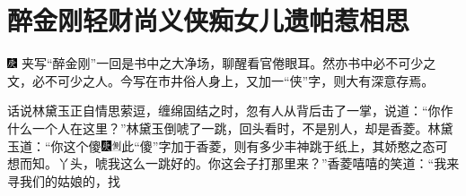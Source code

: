 

\chapter{醉金刚轻财尚义侠\hspace{.5em}痴女儿遗帕惹相思}
{}

{\includegraphics[width=3mm]{../Images/00004}  \kaishu 夹写``醉金刚''一回是书中之大净场，聊醒看官倦眼耳。然亦书中必不可少之文，必不可少之人。今写在市井俗人身上，又加一``侠''字，则大有深意存焉。}

话说林黛玉正自情思萦逗，缠绵固结之时，忽有人从背后击了一掌，说道：``你作什么一个人在这里？''林黛玉倒唬了一跳，回头看时，不是别人，却是香菱。林黛玉道：``你这个傻{\includegraphics[width=3mm]{../Images/00004}\includegraphics[width=3mm]{../Images/00011}\footnotesize \kaishu 此``傻''字加于香菱，则有多少丰神跳于纸上，其娇憨之态可想而知。}丫头，唬我这么一跳好的。你这会子打那里来？''香菱嘻嘻的笑道：``我来寻我们的姑娘的，找